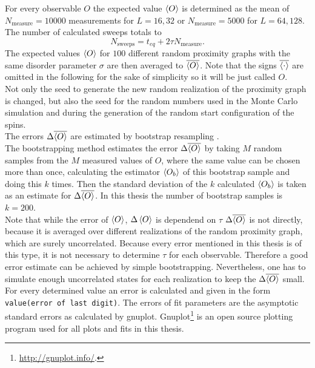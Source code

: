     For every observable \(O\) the expected value \(\left< O \right>\) is determined
    as the mean of \(N_{\mathrm{measure}}=10000\) measurements for \(L=16,32\)
    or \(N_{\mathrm{measure}}=5000\) for \(L=64,128\). The number of
    calculated sweeps totals to
    \[N_{\mathrm{sweeps}}=t_{eq}+2\tau N_{\mathrm{measure}}.\]
    The expected values \(\left< O \right>\) for \(100\) different random proximity
    graphs with the same disorder parameter \(\sigma\) are then averaged to
    \(\overline{\left< O \right>}\). Note that the signs \(\overline{\left< \cdot \right>}\)
    are omitted in the following for the sake of simplicity so
    it will be just called \(O\).\\
    Not only the seed to generate the new random
    realization of the proximity graph is changed, but also the seed for
    the random numbers used in the Monte Carlo simulation and during the
    generation of the random start configuration of the spins.\\
    The errors \(\Delta \overline{\left< O \right>}\) are estimated by bootstrap resampling
    \cite{Bootstrap}.\\
    The bootstrapping method estimates the error \(\Delta \overline{\left< O \right>}\)
    by taking \(M\) random samples from the \(M\) measured values of \(O\),
    where the same value can be chosen more than once, calculating the
    estimator \(\left< O_b \right>\) of this bootstrap sample and doing this \(k\)
    times. Then the standard deviation of the \(k\) calculated \(\left< O_b \right>\)
    is taken as an estimate for \(\Delta \overline{\left< O \right>}\).
    In this thesis the number of bootstrap samples is \(k = 200\).\\
    Note that while the error of \(\left< O \right>\), \(\Delta \left< O \right>\) is dependend on \(\tau\) \cite[p. 151]{Katzgraber2011}
    \(\Delta \overline{\left< O \right>}\) is not directly, because it is averaged
    over different realizations of the random proximity graph, which are
    surely uncorrelated.
    Because every error mentioned in this thesis is of this type, it is not
    necessary to determine \(\tau\) for each observable. Therefore a good
    error estimate can be achieved by simple bootstrapping. Nevertheless, one has
    to simulate enough uncorrelated states for each realization to keep
    the \(\Delta \overline{\left< O \right>}\) small. For every determined value an
    error is calculated and given in the form \texttt{value(error of last digit)}.
    The errors of fit parameters are the asymptotic standard errors as calculated
    by gnuplot. Gnuplot\footnote{\url{http://gnuplot.info/}.} is an open
    source plotting program used for all plots and fits in this thesis.

